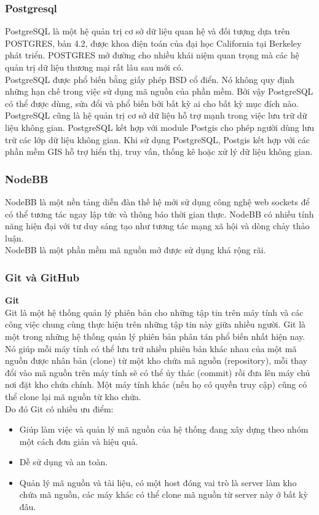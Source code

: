 \documentclass[a4paper,12pt,oneside]{article}
\begin{document}
\subsubsection{Postgresql}
\noindent PostgreSQL là một hệ quản trị cơ sở dữ liệu quan hệ và đối tượng dựa trên POSTGRES, bản 4.2, được khoa điện toán của đại học California tại Berkeley phát triển. POSTGRES mở đường cho nhiều khái niệm quan trọng mà các hệ quản trị dữ liệu thương mại rất lâu sau mới có.\\
PostgreSQL được phổ biến bằng giấy phép BSD cổ điển. Nó không quy định những hạn chế trong việc sử dụng mã nguồn của phần mềm. Bởi vậy PostgreSQL có thể được dùng, sửa đổi và phổ biến bởi bất kỳ ai cho bất kỳ mục đích nào.\\
PostgreSQL cũng là hệ quản trị cơ sở dữ liệu hỗ trợ mạnh trong việc lưu trữ dữ liệu không gian. PostgreSQL kết hợp với module Postgis cho phép người dùng lưu trữ các lớp dữ liệu không gian. Khi sử dụng PostgreSQL, Postgis kết hợp với các phần mềm GIS hỗ trợ hiển thị, truy vấn, thống kê hoặc xử lý dữ liệu không gian.

\subsubsection{NodeBB}
\noindent NodeBB là một nền tảng diễn đàn thế hệ mới sử dụng công nghệ web sockets để có thể tương tác ngay lập tức và thông báo thời gian thực. NodeBB có nhiều tính năng hiện đại với tư duy sáng tạo như tương tác mạng xã hội và dòng chảy thảo luận.\\
\noindent NodeBB là một phần mềm mã nguồn mở được sử dụng khá rộng rãi.
\subsubsection{Git và GitHub}
\noindent \textbf{Git}\\
Git là một hệ thống quản lý phiên bản cho những tập tin trên máy tính và các công việc chung cùng thực
hiện trên những tập tin này giữa nhiều người. Git là một trong những hệ thống quản lý phiên bản phân tán
phổ biến nhất hiện nay. Nó giúp mỗi máy tính có thể lưu trữ nhiều phiên bản khác nhau của một mã nguồn được nhân bản (clone) từ một kho chứa mã nguồn (repository), mỗi thay đổi vào mã nguồn trên máy tính sẽ có thể ủy thác (commit) rồi đưa lên máy chủ nơi đặt kho chứa chính. Một máy tính khác (nếu họ có quyền
truy cập) cũng có thể clone lại mã nguồn từ kho chứa.\\ 
Do đó Git có nhiều ưu điểm:
\begin{itemize}
\item Giúp làm việc và quản lý mã nguồn của hệ thống đang xây dựng theo nhóm một cách đơn giản và hiệu quả.
\item Dễ sử dụng và an toàn.
\item Quản lý mã nguồn và tài liệu, có một host đóng vai trò là server làm kho chứa mã nguồn,
các máy khác có thể clone mã nguồn từ server này ở bất kỳ đâu.
\end{itemize}
\end{document}
